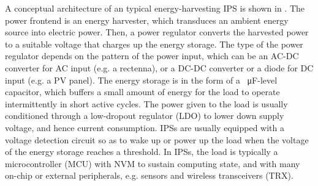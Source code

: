 A conceptual architecture of an typical energy-harvesting IPS is shown in .
The power frontend is an energy harvester, which transduces an ambient energy source into electric power. 
Then, a power regulator converts the harvested power to a suitable voltage that charges up the energy storage.
The type of the power regulator depends on the pattern of the power input, which can be an AC-DC converter for AC input (e.g. a rectenna), or a DC-DC converter or a diode for DC input (e.g. a PV panel). 
The energy storage is in the form of a \SI{}{\micro\farad}-level capacitor, which buffers a small amount of energy for the load to operate intermittently in short active cycles.
The power given to the load is usually conditioned through a low-dropout regulator (LDO) to lower down supply voltage, and hence current consumption. 
IPSs are usually equipped with a voltage detection circuit so as to wake up or power up the load when the voltage of the energy storage reaches a threshold. 
In IPSs, the load is typically a microcontroller (MCU) with NVM to sustain computing state, and with many on-chip or external peripherals, e.g. sensors and wireless transceivers (TRX). 








